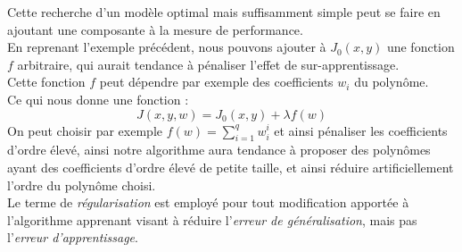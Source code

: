\documentclass[10pt,a4paper]{report}
\begin{document}
	Cette recherche d'un modèle optimal mais suffisamment simple peut se faire en ajoutant une composante à la mesure de performance.\\
	En reprenant l'exemple précédent, nous pouvons ajouter à $J_0(x,y)$ une fonction $f$ arbitraire, qui aurait tendance à pénaliser l'effet de sur-apprentissage.\\
	Cette fonction $f$ peut dépendre par exemple des coefficients $w_i$ du polynôme.\\
	Ce qui nous donne une fonction :
	$$J(x,y,w) = J_0(x,y) + \lambda f(w)$$
	On peut choisir par exemple $f(w) = \sum_{i=1}^{q}{w_i^i}$ et ainsi pénaliser les coefficients d'ordre élevé, ainsi notre algorithme aura tendance à proposer des polynômes ayant des coefficients d'ordre élevé de petite taille, et ainsi réduire artificiellement l'ordre du polynôme choisi.\\
	Le terme de \emph{régularisation} est employé pour tout modification apportée à l'algorithme apprenant visant à réduire l'\emph{erreur de généralisation}, mais pas l'\emph{erreur d'apprentissage}.
	
\end{document}
